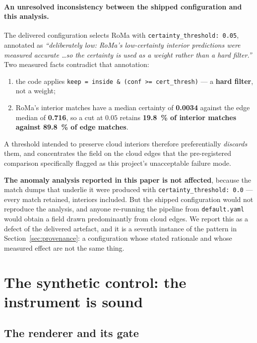 \documentclass[11pt,a4paper]{article}
\begin{document}
\paragraph{An unresolved inconsistency between the shipped configuration and this analysis.}
The delivered configuration selects RoMa with \texttt{certainty\_threshold: 0.05}, annotated
as \emph{``deliberately low: RoMa's low-certainty interior predictions were measured accurate
\dots so the certainty is used as a weight rather than a hard filter.''} Two measured facts
contradict that annotation:

\begin{enumerate}
\item the code applies \texttt{keep = inside \& (conf >= cert\_thresh)} --- a \textbf{hard
filter}, not a weight;
\item RoMa's interior matches have a median certainty of \textbf{0.0034} against the edge
median of \textbf{0.716}, so a cut at $0.05$ retains \textbf{\SI{19.8}{\percent} of interior
matches against \SI{89.8}{\percent} of edge matches}.
\end{enumerate}

A threshold intended to preserve cloud interiors therefore preferentially \emph{discards}
them, and concentrates the field on the cloud edges that the pre-registered comparison
specifically flagged as this project's unacceptable failure mode.

\textbf{The anomaly analysis reported in this paper is not affected}, because the match dumps
that underlie it were produced with \texttt{certainty\_threshold: 0.0} --- every match
retained, interiors included. But the shipped configuration would not reproduce the analysis,
and anyone re-running the pipeline from \texttt{default.yaml} would obtain a field drawn
predominantly from cloud edges. We report this as a defect of the delivered artefact, and it
is a seventh instance of the pattern in Section~\ref{sec:provenance}: a configuration whose
stated rationale and whose measured effect are not the same thing.

\section{The synthetic control: the instrument is sound}
\label{sec:synthetic}

\subsection{The renderer and its gate}
\end{document}
